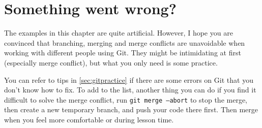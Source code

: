

\section{Something went wrong?}

The examples in this chapter are quite artificial. However, I hope you are convinced that branching, merging and merge conflicts are unavoidable when working with different people using Git. They might be intimidating at first (especially merge conflict), but what you only need is some practice. 

You can refer to tips in \cref{sec:gitpractice} if there are some errors on Git that you don't know how to fix. To add to the list, another thing you can do if you find it difficult to solve the merge conflict, run \texttt{git merge --abort} to stop the merge, then create a new temporary branch, and push your code there first. Then merge when you feel more comfortable or during lesson time.


